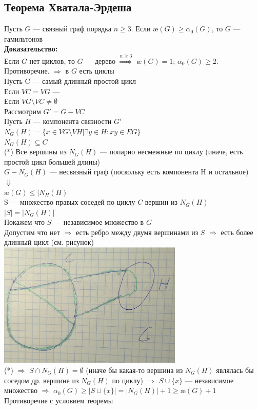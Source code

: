 \documentclass[12pt]{article}
\begin{document}
\subsection{Теорема Хватала-Эрдеша}
	Пусть $G$ — связный граф порядка $n \geqslant 3$. Если $æ(G) \geqslant \alpha_0(G)$, то $G$ — гамильтонов\\
	\textbf{Доказательство:}\\
		Если $G$ нет циклов, то $G$ — дерево $\overset{n \geqslant 3}{\Rightarrow}$ $æ(G) = 1$; $\alpha_0(G) \geqslant 2$. Противоречие.
		$\Rightarrow$ в $G$  есть циклы\\
		Пусть C — самый длинный простой цикл\\
		Если $VC = VG$ — \qedsymbol\\
		Если $VG \setminus VC \neq \emptyset$\\
		Рассмотрим $G' = G - VC$\\
		Пусть $H$ — компонента связности $G'$\\
		$N_G(H) = \{x \in VG \setminus VH | \exists y \in H: xy \in EG\}$\\
		$N_G(H) \subseteq C$\\
		(*) Все вершины из $N_G(H)$ — попарно несмежные по циклу (иначе, есть простой цикл большей длины)\\
		$G - N_G(H)$ — несвязный граф (поскольку есть компонента H и остальное)\\
		$\Downarrow$\\
		$æ(G) \leqslant |N_H(H)|$\\
		S — множество правых соседей по циклу $C$ вершин из $N_G(H)$\\
		$|S| = |N_G(H)|$\\
		Покажем что $S$ — независимое множество в $G$\\
		Допустим что нет $\Rightarrow$ есть ребро между двумя вершинами из $S$ $\Rightarrow$ есть более длинный цикл (см. рисунок)\\
		\includegraphics[width=250pt]{4}\\
		(*) $\Rightarrow$ $S \cap N_G(H) = \emptyset$ (иначе бы какая-то вершина из $N_G(H)$ являлась бы соседом др. вершине из $N_G(H)$ по циклу) $\Rightarrow$ $S \cup \{x\}$ — независимое множество $\Rightarrow$ $\alpha_0(G) \geqslant |S \cup \{x\}| = |N_G(H)| + 1 \geqslant æ(G) + 1$\\
		Противоречие с условием теоремы\\
		\qedsymbol
\end{document}
